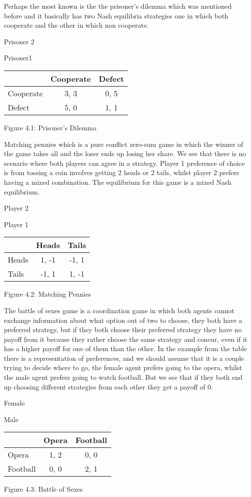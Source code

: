 \documentclass{article}
\begin{document}
Perhaps the most known is the the prisoner's dilemma which was mentioned before and it basically has two Nash equilibria strategies one in which both cooperate and the other in which non cooperate.
\begin{center}
Prisoner 2

Prisoner1
\begin{tabular}{|l|c|c|}
\hline
 & Cooperate & Defect \\ 
\hline
Cooperate & 3, 3 & 0, 5\\
\hline
 Defect & 5, 0 & 1, 1\\
\hline
\end{tabular}
\end{center}
\begin{center}
	Figure 4.1: Prisoner's Dilemma
\end{center}


Matching pennies which is a pure conflict zero-sum game in which the winner of the game takes all and the loser ends up losing her share. We see that there is no scenario where both players can agree in a strategy. Player 1 preference of choice is from tossing a coin involves getting 2 heads or 2 tails, whilst player 2 prefers having a mixed combination.  The equilibrium for this game is a mixed Nash equilibrium.
\begin{center}
Player 2


Player 1
\begin{tabular}{|l|c|c|}
\hline
 & Heads & Tails \\ 
\hline
Heads & 1, -1 & -1, 1\\
\hline
 Tails & -1, 1 & 1, -1\\
\hline
\end{tabular}
\end{center}
\begin{center}
	Figure 4.2: Matching Pennies
\end{center}


The battle of sexes game is a coordination game in which both agents cannot exchange information about what option out of two to choose, they both have a preferred strategy, but if they both choose their preferred strategy they have no payoff from it because they rather choose the same strategy and concur,  even if it has a higher payoff for one of them than the other. In the example from the table there is a representation of preferences, and we should assume that it is a couple trying to decide where to go, the female agent prefers going to the opera, whilst the male agent prefers going to watch football. But we see that if they both end up choosing different strategies from each other they get a payoff of 0. 
\begin{center}
Female


Male
\begin{tabular}{|l|c|c|}
\hline
 & Opera & Football \\ 
\hline
Opera & 1, 2 & 0, 0\\
\hline
 Football & 0, 0 & 2, 1\\
\hline
\end{tabular}
\end{center}
\begin{center}
	Figure 4.3: Battle of Sexes
\end{center}
\end{document}
